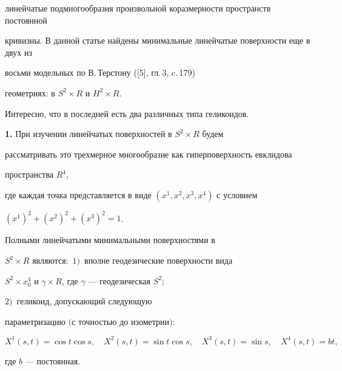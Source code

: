 линейчатые подмногообразия произвольной коразмерности пространств постоянной 


кривизны. В данной статье найдены минимальные линейчатые поверхности еще в двух из 


восьми модельных по В.\,Терстону ([5], гл.\,3, c.\,179)


геометриях: в $S^2 \times R$ и $H^2 \times R$. 


Интересно, что в последней есть два различных типа геликоидов.


\medskip





{\bf 1.} При изучении линейчатых поверхностей в $S^2 \times R$ будем 


рассматривать это трехмерное многообразие как гиперповерхность евклидова 


пространства $R^4$,


где каждая точка представляется в виде $(x^1,x^2,x^3,x^4)$ с условием 


$(x^1)^2+(x^2)^2+(x^3)^2=1$. 





\begin{thm} Полными линейчатыми минимальными поверхностями в 


$S^2 \times R$ являются\/${:}$ $1)$~вполне геодезические  поверхности вида


$S^2 \times {x^4_0}$ и  $ \gamma \times R$, где $\gamma$ --- геодезическая $S^2;$


$2)$~геликоид, допускающий следующую 


параметризацию $($с точностью до изометрии$){:}$ 


\begin{equation}


X^1(s,t)= \cos t \cos s, \quad


X^2(s,t)= \sin t \cos s,\quad   X^3(s,t)= \sin s,\quad X^4(s,t)= bt,


\end{equation}


где $b$ --- постоянная. 


\end{thm}





